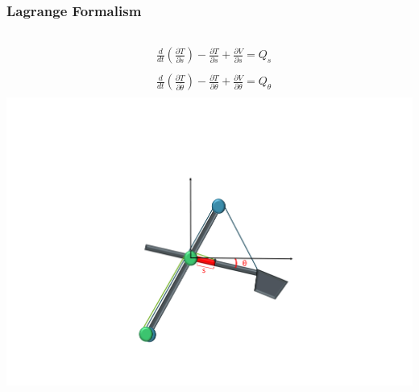 \begin{frame}
	\frametitle{Lagrange Formalism}
	
	\begin{columns}
		\begin{align*}
			&\frac{d}{dt}\left(\frac{\partial T}{\partial \dot{s}}\right) -
			\frac{\partial T}{\partial s} +
			\frac{\partial V}{\partial s}
			= Q_s \\
			&{}\\
			&\frac{d}{dt}\left(\frac{\partial T}{\partial \dot{\theta}}\right) -
			\frac{\partial T}{\partial \theta} +
			\frac{\partial V}{\partial \theta}
			= Q_{\theta} \\
		\end{align*}
		\centering
		\includegraphics[trim=30cm 5cm 30cm 23cm, clip=true, width=\linewidth]{img/Excavator_ill_dof}
	\end{columns}
	
\end{frame}

